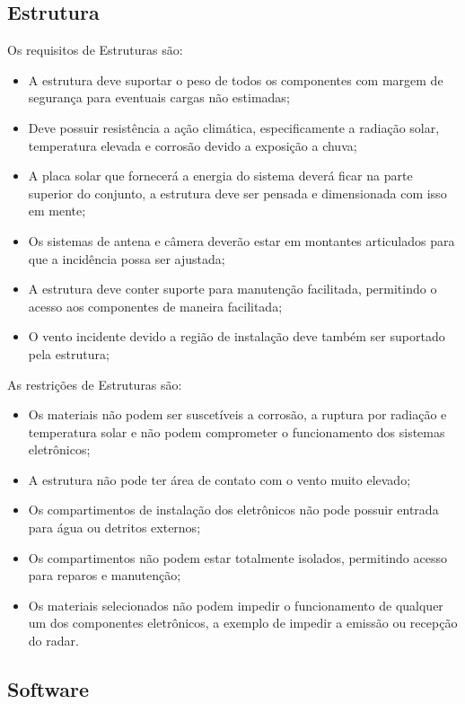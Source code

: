 \subsection{Estrutura}

Os requisitos de Estruturas são:

\begin{itemize}
	\item A estrutura deve suportar o peso de todos os componentes com margem de segurança para eventuais cargas não estimadas;
	\item Deve possuir resistência a ação climática, especificamente a radiação solar, temperatura elevada e corrosão devido a exposição a chuva;
	\item A placa solar que fornecerá a energia do sistema deverá ficar na parte superior do conjunto, a estrutura deve ser pensada e dimensionada com isso em mente;
	\item Os sistemas de antena e câmera deverão estar em montantes articulados para que a incidência possa ser ajustada;
	\item A estrutura deve conter suporte para manutenção facilitada, permitindo o acesso aos componentes de maneira facilitada;
	\item O vento incidente devido a região de instalação deve também ser suportado pela estrutura;
\end{itemize}

As restrições de Estruturas são:

\begin{itemize}
	\item Os materiais não podem ser suscetíveis a corrosão, a ruptura por radiação e temperatura solar e não podem comprometer o funcionamento dos sistemas eletrônicos;
	\item A estrutura não pode ter área de contato com o vento muito elevado;
	\item Os compartimentos de instalação dos eletrônicos não pode possuir entrada para água ou detritos externos;
	\item Os compartimentos não podem estar totalmente isolados, permitindo acesso para reparos e manutenção;
	\item Os materiais selecionados não podem impedir o funcionamento de qualquer um dos componentes eletrônicos, a exemplo de impedir a emissão ou recepção do radar.
\end{itemize}

\subsection{Software}

